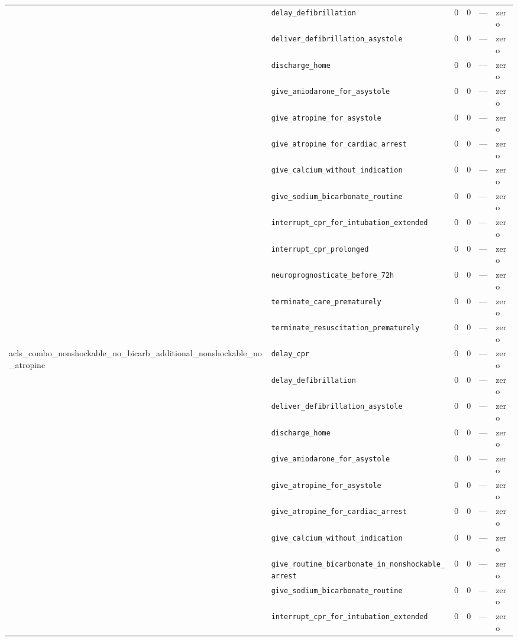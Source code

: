 \begin{table}[ht]
\begin{tabular}{llrrrl}
 & \texttt{delay\_defibrillation} & 0 & 0 & — & zero \\
 & \texttt{deliver\_defibrillation\_asystole} & 0 & 0 & — & zero \\
 & \texttt{discharge\_home} & 0 & 0 & — & zero \\
 & \texttt{give\_amiodarone\_for\_asystole} & 0 & 0 & — & zero \\
 & \texttt{give\_atropine\_for\_asystole} & 0 & 0 & — & zero \\
 & \texttt{give\_atropine\_for\_cardiac\_arrest} & 0 & 0 & — & zero \\
 & \texttt{give\_calcium\_without\_indication} & 0 & 0 & — & zero \\
 & \texttt{give\_sodium\_bicarbonate\_routine} & 0 & 0 & — & zero \\
 & \texttt{interrupt\_cpr\_for\_intubation\_extended} & 0 & 0 & — & zero \\
 & \texttt{interrupt\_cpr\_prolonged} & 0 & 0 & — & zero \\
 & \texttt{neuroprognosticate\_before\_72h} & 0 & 0 & — & zero \\
 & \texttt{terminate\_care\_prematurely} & 0 & 0 & — & zero \\
 & \texttt{terminate\_resuscitation\_prematurely} & 0 & 0 & — & zero \\
\midrule
acls\_combo\_nonshockable\_no\_bicarb\_additional\_nonshockable\_no\_atropine & \texttt{delay\_cpr} & 0 & 0 & — & zero \\
 & \texttt{delay\_defibrillation} & 0 & 0 & — & zero \\
 & \texttt{deliver\_defibrillation\_asystole} & 0 & 0 & — & zero \\
 & \texttt{discharge\_home} & 0 & 0 & — & zero \\
 & \texttt{give\_amiodarone\_for\_asystole} & 0 & 0 & — & zero \\
 & \texttt{give\_atropine\_for\_asystole} & 0 & 0 & — & zero \\
 & \texttt{give\_atropine\_for\_cardiac\_arrest} & 0 & 0 & — & zero \\
 & \texttt{give\_calcium\_without\_indication} & 0 & 0 & — & zero \\
 & \texttt{give\_routine\_bicarbonate\_in\_nonshockable\_arrest} & 0 & 0 & — & zero \\
 & \texttt{give\_sodium\_bicarbonate\_routine} & 0 & 0 & — & zero \\
 & \texttt{interrupt\_cpr\_for\_intubation\_extended} & 0 & 0 & — & zero \\

\end{tabular}
\end{table}
